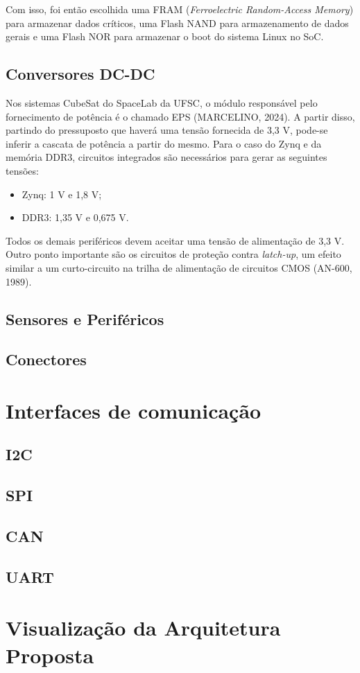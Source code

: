 Com isso, foi então escolhida uma FRAM (\textit{Ferroelectric Random-Access Memory}) para armazenar dados críticos, uma Flash NAND para armazenamento de dados gerais e uma Flash NOR para armazenar o boot do sistema Linux no SoC.

\subsection{Conversores DC-DC}
Nos sistemas CubeSat do SpaceLab da UFSC, o módulo responsável pelo fornecimento de potência é o chamado EPS (MARCELINO, 2024). A partir disso, partindo do pressuposto que haverá uma tensão fornecida de 3,3 V, pode-se inferir a cascata de potência a partir do mesmo. Para o caso do Zynq e da memória DDR3, circuitos integrados são necessários para gerar as seguintes tensões: 

\begin{itemize}
	\item Zynq: 1 V e 1,8 V; 
	\item DDR3: 1,35 V e 0,675 V.
\end{itemize}

Todos os demais periféricos devem aceitar uma tensão de alimentação de 3,3 V. Outro ponto importante são os circuitos de proteção contra \textit{latch-up}, um efeito similar a um curto-circuito na trilha de alimentação de circuitos CMOS (AN-600, 1989). 

\subsection{Sensores e Periféricos}

\subsection{Conectores}

\section{Interfaces de comunicação}

\subsection{I2C}

\subsection{SPI}

\subsection{CAN}

\subsection{UART}

\section{Visualização da Arquitetura Proposta}